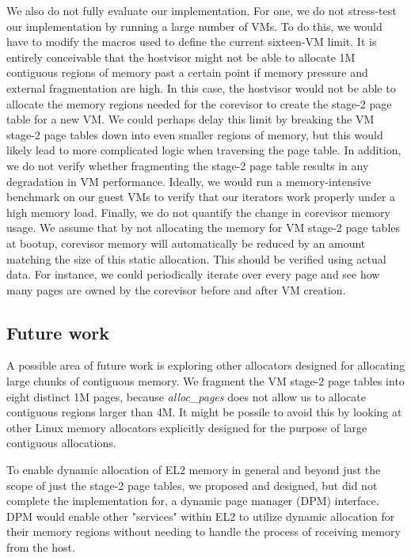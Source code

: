 We also do not fully evaluate our implementation. For one, we do not stress-test our implementation by running a large number
of VMs. To do this, we would have to modify the macros used to define the current
sixteen-VM limit. It is entirely conceivable that the hostvisor might not be able
to allocate 1M contiguous regions of memory past a certain point if memory
pressure and external fragmentation are high. In this case, the hostvisor would
not be able to allocate the memory regions needed for the corevisor to create
the stage-2 page table for a new VM. We could perhaps delay this limit by breaking
the VM stage-2 page tables down into even smaller regions of memory, but this would
likely lead to more complicated logic when traversing the page table. In addition, we do not verify whether fragmenting the stage-2 page table results
in any degradation in VM performance. Ideally, we would run a memory-intensive
benchmark on our guest VMs to verify that our iterators work properly under a
high memory load. Finally, we do not quantify the change in corevisor memory usage.
We assume that by not allocating the memory for VM stage-2 page tables at bootup,
corevisor memory will automatically be reduced by an amount matching the
size of this static allocation. This should be verified using actual data. For
instance, we could periodically iterate over every page and see how many pages
are owned by the corevisor before and after VM creation.

\subsection{Future work}

A possible area of future work is exploring other allocators designed for
allocating large chunks of contiguous memory. We fragment the VM stage-2 page tables
into eight distinct 1M pages, because \textit{alloc\_pages} does not allow us
to allocate contiguous regions larger than 4M. It might be possile to avoid this
by looking at other Linux memory allocators explicitly designed for the purpose
of large contiguous allocations.

To enable dynamic allocation of EL2 memory in general and beyond just the scope of just
the stage-2 page tables, we proposed and designed, but did not complete the implementation for,
a dynamic page manager (DPM) interface. DPM would enable other "services" within EL2 to
utilize dynamic allocation for their memory regions without needing to handle the process
of receiving memory from the host.


